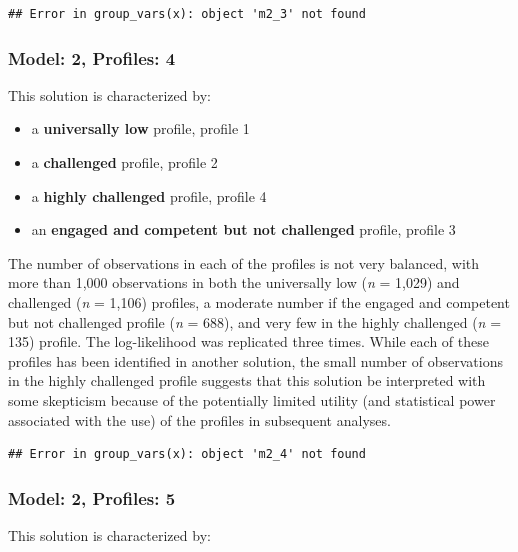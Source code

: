 \documentclass[]{book}
\providecommand{\tightlist}{%
  \setlength{\itemsep}{0pt}\setlength{\parskip}{0pt}}
\theoremstyle{definition}
\theoremstyle{definition}
\theoremstyle{definition}
\theoremstyle{remark}
\begin{document}
\begin{verbatim}
## Error in group_vars(x): object 'm2_3' not found
\end{verbatim}

\subsubsection{Model: 2, Profiles: 4}\label{model-2-profiles-4}

This solution is characterized by:

\begin{itemize}
\tightlist
\item
  a \textbf{universally low} profile, profile 1
\item
  a \textbf{challenged} profile, profile 2
\item
  a \textbf{highly challenged} profile, profile 4
\item
  an \textbf{engaged and competent but not challenged} profile, profile
  3
\end{itemize}

The number of observations in each of the profiles is not very balanced,
with more than 1,000 observations in both the universally low (\emph{n}
= 1,029) and challenged (\emph{n} = 1,106) profiles, a moderate number
if the engaged and competent but not challenged profile (\emph{n} =
688), and very few in the highly challenged (\emph{n} = 135) profile.
The log-likelihood was replicated three times. While each of these
profiles has been identified in another solution, the small number of
observations in the highly challenged profile suggests that this
solution be interpreted with some skepticism because of the potentially
limited utility (and statistical power associated with the use) of the
profiles in subsequent analyses.

\begin{verbatim}
## Error in group_vars(x): object 'm2_4' not found
\end{verbatim}

\subsubsection{Model: 2, Profiles: 5}\label{model-2-profiles-5}

This solution is characterized by:
\end{document}
